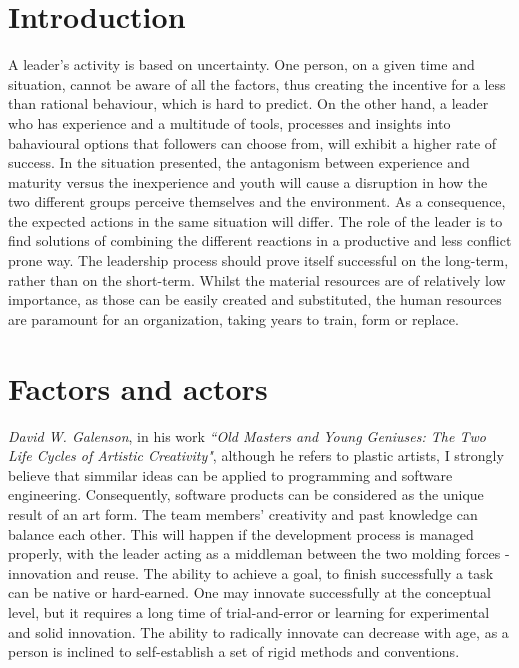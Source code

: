 \documentclass[conference]{IEEEtran}
\begin{document}
\section{Introduction}
A leader's activity is based on uncertainty. One person, on a given time and situation, cannot be aware of all the factors, thus creating the incentive for a less than rational behaviour, which is hard to predict. On the other hand, a leader who has experience and a multitude of tools, processes and insights into bahavioural options that followers can choose from, will exhibit a higher rate of success.   
\newline\indent
In the situation presented, the antagonism between experience and maturity versus the inexperience and youth will cause a disruption in how the two different groups perceive themselves and the environment. As a consequence, the expected actions in the same situation will differ. The role of the leader is to find solutions of combining the different reactions in a productive and less conflict prone way. The leadership process should prove itself successful on the long-term, rather than on the short-term.
\newline\indent
Whilst the material resources are of relatively low importance, as those can be easily created and substituted, the human resources are paramount for an organization, taking years to train, form or replace.    

\section{Factors and actors}    
\emph{David W. Galenson}, in his work \emph{``Old Masters and Young Geniuses: The Two Life Cycles of Artistic Creativity"}, although he refers to plastic artists, I strongly believe that simmilar ideas can be applied to programming and software engineering. Consequently, software products can be considered as the unique result of an art form. The team members' creativity and past knowledge can balance each other. This will happen if the development process is managed properly, with the leader acting as a middleman between the two molding forces - innovation and reuse.
\newline\indent
The ability to achieve a goal, to finish successfully a task can be native or hard-earned. One may innovate successfully at the conceptual level, but it requires a long time of trial-and-error or learning for experimental and solid innovation. The ability to radically innovate can decrease with age, as a person is inclined to self-establish a set of rigid methods and conventions.\cite{IEEEhowto:oldvsyoung}
\end{document}
